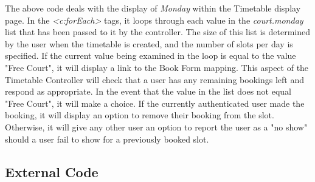 The above code deals with the display of \textit{Monday} within the Timetable display page. In the \textit{<c:forEach>} tags, it loops through each value in the \textit{court.monday} list that has been passed to it by the controller. The size of this list is determined by the user when the timetable is created, and the number of slots per day is specified. If the current value being examined in the loop is equal to the value "Free Court", it will display a link to the Book Form mapping. This aspect of the Timetable Controller will check that a user has any remaining bookings left and respond as appropriate. In the event that the value in the list does not equal "Free Court", it will make a choice. If the currently authenticated user made the booking, it will display an option to remove their booking from the slot. Otherwise, it will give any other user an option to report the user as a "no show" should a user fail to show for a previously booked slot. 


\subsection{External Code}



